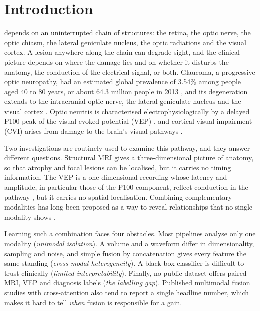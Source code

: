\documentclass{ieeeaccessapprox}
\begin{document}
\section{Introduction}
 depends on an uninterrupted chain of structures: the retina, the optic nerve, the optic chiasm, the lateral geniculate nucleus, the optic radiations and the visual cortex. A lesion anywhere along the chain can degrade sight, and the clinical picture depends on where the damage lies and on whether it disturbs the anatomy, the conduction of the electrical signal, or both. Glaucoma, a progressive optic neuropathy, had an estimated global prevalence of 3.54\% among people aged 40 to 80 years, or about 64.3 million people in 2013 \cite{tham2014}, and its degeneration extends to the intracranial optic nerve, the lateral geniculate nucleus and the visual cortex \cite{gupta2006}. Optic neuritis is characterised electrophysiologically by a delayed P100 peak of the visual evoked potential (VEP) \cite{halliday1972}, and cortical visual impairment (CVI) arises from damage to the brain's visual pathways \cite{sakki2018}.

Two investigations are routinely used to examine this pathway, and they answer different questions. Structural MRI gives a three-dimensional picture of anatomy, so that atrophy and focal lesions can be localised, but it carries no timing information. The VEP is a one-dimensional recording whose latency and amplitude, in particular those of the P100 component, reflect conduction in the pathway \cite{odom2016}, but it carries no spatial localisation. Combining complementary modalities has long been proposed as a way to reveal relationships that no single modality shows \cite{calhoun2016}.

Learning such a combination faces four obstacles. Most pipelines analyse only one modality (\emph{unimodal isolation}). A volume and a waveform differ in dimensionality, sampling and noise, and simple fusion by concatenation gives every feature the same standing (\emph{cross-modal heterogeneity}). A black-box classifier is difficult to trust clinically (\emph{limited interpretability}). Finally, no public dataset offers paired MRI, VEP and diagnosis labels (\emph{the labelling gap}). Published multimodal fusion studies with cross-attention \cite{zhou2024camf,dhar2025drifa} also tend to report a single headline number, which makes it hard to tell \emph{when} fusion is responsible for a gain.
\end{document}
